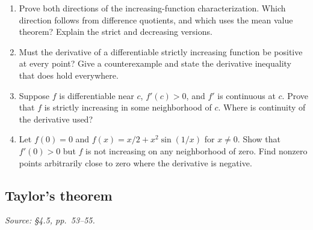 \begin{enumerate}[resume]
  \item Prove both directions of the increasing-function
    characterization. Which direction follows from difference
    quotients, and which uses the mean value theorem?
    Explain the strict and decreasing versions.

  \item Must the derivative of a differentiable strictly increasing
    function be positive at every point? Give a counterexample and
    state the derivative inequality that does hold everywhere.

  \item Suppose \(f\) is differentiable near \(c\), \(f'(c)>0\),
    and \(f'\) is continuous at \(c\). Prove that \(f\) is
    strictly increasing in some neighborhood of \(c\).
    Where is continuity of the derivative used?

  \item Let \(f(0)=0\) and
    \(f(x)=x/2+x^2\sin(1/x)\) for \(x\ne0\).
    Show that \(f'(0)>0\) but \(f\) is not increasing on any
    neighborhood of zero. Find nonzero points arbitrarily close to
    zero where the derivative is negative.
\end{enumerate}

\subsection{Taylor's theorem}
\textit{Source: \S4.5, pp.~53--55.}

